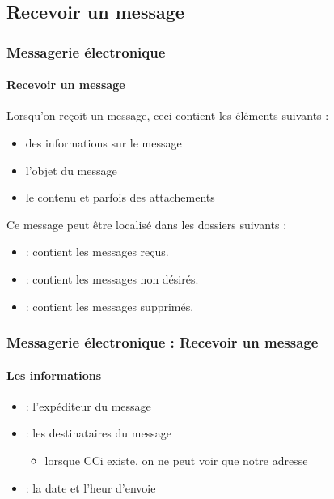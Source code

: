 \documentclass[xcolor=table]{beamer}
\begin{document}
\subsection{Recevoir un message}

\begin{frame}
\frametitle{Messagerie électronique}
\framesubtitle{Recevoir un message}

Lorsqu'on reçoit un message, ceci contient les éléments suivants : 
\begin{itemize}
	\item des informations sur le message
	\item l'objet du message
	\item le contenu et parfois des attachements
\end{itemize}

Ce message peut être localisé dans les dossiers suivants :
\begin{itemize}
	\item {} : contient les messages reçus.
	\item {} : contient les messages non désirés.
	\item {} : contient les messages supprimés.
\end{itemize}

\end{frame}

\begin{frame}
\frametitle{Messagerie électronique : Recevoir un message}
\framesubtitle{Les informations}

\begin{itemize}
	\item {} : l'expéditeur du message
	
	\item {} : les destinataires du message 
	\begin{itemize}
		\item lorsque CCi existe, on ne peut voir que notre adresse 
	\end{itemize}
	
	\item {} : la date et l'heur d'envoie  
	
\end{itemize}


\end{frame}
\end{document}
